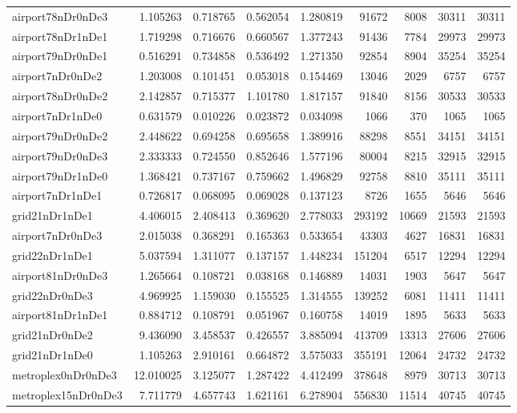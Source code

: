 \documentclass[../../../thesis.tex]{subfiles}
\begin{document}
\begin{longtable}{|l|r|r|r|r|r|r|r|r|}
airport78nDr0nDe3 & 1.105263 & 0.718765 & 0.562054 & 1.280819 & 91672 & 8008 & 30311 & 30311 \\
airport78nDr1nDe1 & 1.719298 & 0.716676 & 0.660567 & 1.377243 & 91436 & 7784 & 29973 & 29973 \\
airport79nDr0nDe1 & 0.516291 & 0.734858 & 0.536492 & 1.271350 & 92854 & 8904 & 35254 & 35254 \\
airport7nDr0nDe2 & 1.203008 & 0.101451 & 0.053018 & 0.154469 & 13046 & 2029 & 6757 & 6757 \\
airport78nDr0nDe2 & 2.142857 & 0.715377 & 1.101780 & 1.817157 & 91840 & 8156 & 30533 & 30533 \\
airport7nDr1nDe0 & 0.631579 & 0.010226 & 0.023872 & 0.034098 & 1066 & 370 & 1065 & 1065 \\
airport79nDr0nDe2 & 2.448622 & 0.694258 & 0.695658 & 1.389916 & 88298 & 8551 & 34151 & 34151 \\
airport79nDr0nDe3 & 2.333333 & 0.724550 & 0.852646 & 1.577196 & 80004 & 8215 & 32915 & 32915 \\
airport79nDr1nDe0 & 1.368421 & 0.737167 & 0.759662 & 1.496829 & 92758 & 8810 & 35111 & 35111 \\
airport7nDr1nDe1 & 0.726817 & 0.068095 & 0.069028 & 0.137123 & 8726 & 1655 & 5646 & 5646 \\
grid21nDr1nDe1 & 4.406015 & 2.408413 & 0.369620 & 2.778033 & 293192 & 10669 & 21593 & 21593 \\
airport7nDr0nDe3 & 2.015038 & 0.368291 & 0.165363 & 0.533654 & 43303 & 4627 & 16831 & 16831 \\
grid22nDr1nDe1 & 5.037594 & 1.311077 & 0.137157 & 1.448234 & 151204 & 6517 & 12294 & 12294 \\
airport81nDr0nDe3 & 1.265664 & 0.108721 & 0.038168 & 0.146889 & 14031 & 1903 & 5647 & 5647 \\
grid22nDr0nDe3 & 4.969925 & 1.159030 & 0.155525 & 1.314555 & 139252 & 6081 & 11411 & 11411 \\
airport81nDr1nDe1 & 0.884712 & 0.108791 & 0.051967 & 0.160758 & 14019 & 1895 & 5633 & 5633 \\
grid21nDr0nDe2 & 9.436090 & 3.458537 & 0.426557 & 3.885094 & 413709 & 13313 & 27606 & 27606 \\
grid21nDr1nDe0 & 1.105263 & 2.910161 & 0.664872 & 3.575033 & 355191 & 12064 & 24732 & 24732 \\
metroplex0nDr0nDe3 & 12.010025 & 3.125077 & 1.287422 & 4.412499 & 378648 & 8979 & 30713 & 30713 \\
metroplex15nDr0nDe3 & 7.711779 & 4.657743 & 1.621161 & 6.278904 & 556830 & 11514 & 40745 & 40745 \\

\end{longtable}
\end{document}
